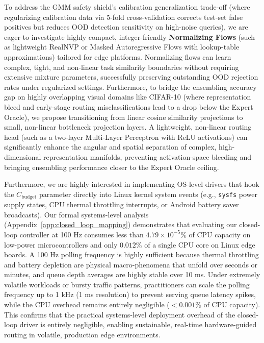 To address the GMM safety shield's calibration generalization trade-off (where regularizing calibration data via 5-fold cross-validation corrects test-set false positives but reduces OOD detection sensitivity on high-noise queries), we are eager to investigate highly compact, integer-friendly \textbf{Normalizing Flows} (such as lightweight RealNVP or Masked Autoregressive Flows with lookup-table approximations) tailored for edge platforms. Normalizing flows can learn complex, tight, and non-linear task similarity boundaries without requiring extensive mixture parameters, successfully preserving outstanding OOD rejection rates under regularized settings. Furthermore, to bridge the ensembling accuracy gap on highly overlapping visual domains like CIFAR-10 (where representation bleed and early-stage routing misclassifications lead to a drop below the Expert Oracle), we propose transitioning from linear cosine similarity projections to small, non-linear bottleneck projection layers. A lightweight, non-linear routing head (such as a two-layer Multi-Layer Perceptron with ReLU activations) can significantly enhance the angular and spatial separation of complex, high-dimensional representation manifolds, preventing activation-space bleeding and bringing ensembling performance closer to the Expert Oracle ceiling.

Furthermore, we are highly interested in implementing OS-level drivers that hook the $C_{\text{budget}}$ parameter directly into Linux kernel system events (e.g., \texttt{sysfs} power supply states, CPU thermal throttling interrupts, or Android battery saver broadcasts). Our formal systems-level analysis (Appendix~\ref{app:closed_loop_mapping}) demonstrates that evaluating our closed-loop controller at 100 Hz consumes less than $4.79 \times 10^{-5}\%$ of CPU capacity on low-power microcontrollers and only $0.012\%$ of a single CPU core on Linux edge boards. A 100 Hz polling frequency is highly sufficient because thermal throttling and battery depletion are physical macro-phenomena that unfold over seconds or minutes, and queue depth averages are highly stable over 10 ms. Under extremely volatile workloads or bursty traffic patterns, practitioners can scale the polling frequency up to 1 kHz (1 ms resolution) to prevent serving queue latency spikes, while the CPU overhead remains entirely negligible ($<0.001\%$ of CPU capacity). This confirms that the practical systems-level deployment overhead of the closed-loop driver is entirely negligible, enabling sustainable, real-time hardware-guided routing in volatile, production edge environments.
